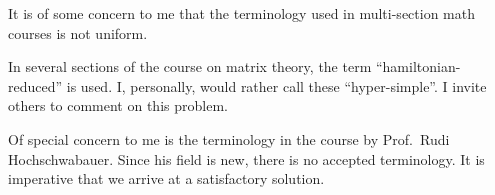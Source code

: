 \documentclass{sample}
\begin{document}
It is of some concern to me   that 
the terminology used in  multi-section
 math courses is not uniform.

In several sections of the course on 
matrix theory, the  term   
 ``hamiltonian-reduced'' is used. 
 I, personally, would rather call these 
``hyper-simple''. I invite others 
 to comment on this  problem.

Of special concern to me is the terminology in the course 
by Prof.~Rudi Hochschwabauer.
Since his field is new, there is no accepted
terminology.   It is imperative 
that we arrive at a satisfactory solution.
\end{document}
